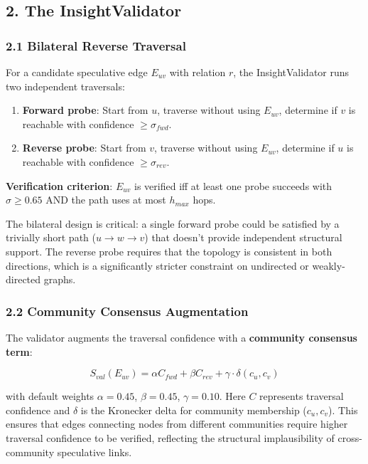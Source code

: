 \subsection*{2. The InsightValidator}

\subsubsection*{2.1 Bilateral Reverse Traversal}
For a candidate speculative edge $E_{uv}$ with relation $r$, the InsightValidator runs two independent traversals:

\begin{enumerate}
  \item \textbf{Forward probe}: Start from $u$, traverse without using $E_{uv}$, determine if $v$ is reachable with confidence $\geq \sigma_{fwd}$.
  \item \textbf{Reverse probe}: Start from $v$, traverse without using $E_{uv}$, determine if $u$ is reachable with confidence $\geq \sigma_{rev}$.
\end{enumerate}


\textbf{Verification criterion}: $E_{uv}$ is verified iff at least one probe succeeds with $\sigma \geq 0.65$ AND the path uses at most $h_{max}$ hops.

The bilateral design is critical: a single forward probe could be satisfied by a trivially short path ($u \to w \to v$) that doesn't provide independent structural support. The reverse probe requires that the topology is consistent in both directions, which is a significantly stricter constraint on undirected or weakly-directed graphs.

\subsubsection*{2.2 Community Consensus Augmentation}
The validator augments the traversal confidence with a \textbf{community consensus term}:

$$S_{val}(E_{uv}) = \alpha C_{fwd} + \beta C_{rev} + \gamma \cdot \delta(c_u, c_v)$$

with default weights $\alpha=0.45$, $\beta=0.45$, $\gamma=0.10$. Here $C$ represents traversal confidence and $\delta$ is the Kronecker delta for community membership ($c_u, c_v$). This ensures that edges connecting nodes from different communities require higher traversal confidence to be verified, reflecting the structural implausibility of cross-community speculative links.

